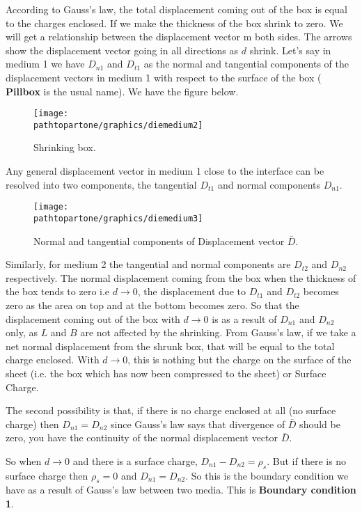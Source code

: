 According to Gauss's law, the total displacement coming out of the box is equal to the charges enclosed. If we make the thickness of the box shrink to zero. We will get a relationship between the displacement vector m both sides. The arrows show the displacement vector going in all directions as $d$ shrink.  Let's say in medium 1 we have $D_{n1}$ and $D_{t1}$ as the normal and tangential components of the displacement vectors in medium 1 with respect to the surface of the box (\textbf { Pillbox} is the usual name). We have the figure below.
\begin{figure}[h]
\centering
\texttt{[image: \\pathtopartone/graphics/diemedium2]}
\caption{Shrinking box.}
\end{figure}

Any general displacement vector in medium 1 close to the interface can be resolved into two components, the tangential $D_{t1}$ and normal components $D_{n1}$. 
\begin{figure}[h]
\centering
\texttt{[image: \\pathtopartone/graphics/diemedium3]}
\caption{Normal and tangential components of Displacement vector $\bar{D}$.}
\end{figure}
Similarly, for medium 2 the tangential and normal components are $D_{t2}$ and $D_{n2}$ respectively. The normal displacement coming from the box when the thickness of the box tends to zero i.e $d \longrightarrow 0$, the displacement due to $D_{t1}$ and $D_{t2}$ becomes zero as the area on top and at the bottom becomes zero. So that the displacement coming out of the box with $d \longrightarrow 0$ is as a result of $D_{n1}$ and $D_{n2}$ only, as $L$ and $B$ are not affected by the shrinking. From Gauss's law, if we take a net normal displacement from the shrunk box, that will be equal to the total charge enclosed. With $d \longrightarrow 0$, this is nothing but the charge on the surface of the sheet (i.e. the box which has now been compressed to the sheet) or Surface Charge.

The second possibility is that, if there is no charge enclosed at all (no surface charge) then $D_{n1}= D_{n2}$ since Gauss's law says that divergence of $\bar{D}$ should be zero, you have the continuity of the normal displacement vector $\bar{D}$.

So when 
$d \longrightarrow 0$ and there is a surface charge, $D_{n1}- D_{n2} = \rho_s$. But if there is no surface charge then $\rho_s = 0$ and $D_{n1}= D_{n2}$. So this is the boundary condition we have as a result of Gauss's law between two media. This is \textbf{Boundary condition 1}.


